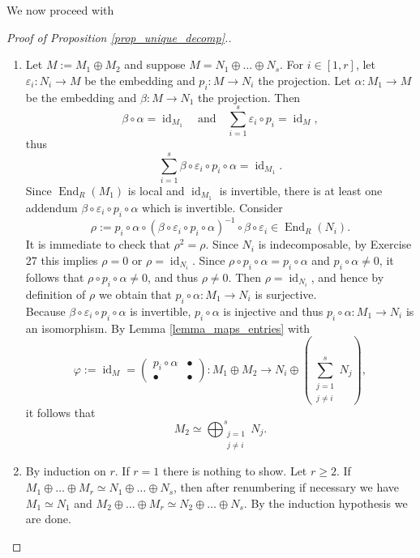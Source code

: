 \documentclass[12pt,a4paper]{report}
\theoremstyle{definition}
\theoremstyle{num.custom-title}
\DeclareMathOperator{\id}{id}
\DeclareMathOperator{\End}{End}
\renewcommand{\epsilon}{\varepsilon}
\renewcommand{\phi}{\varphi}
\begin{document}
We now proceed with
\begin{proof}[Proof of Proposition \ref{prop_unique_decomp}.]\ 
\begin{enumerate}
\item Let $M := M_1 \oplus M_2$ and suppose $M = N_1 \oplus \ldots \oplus N_s$. For $i \in [1,r]$, let $\epsilon_i : N_i \to M$ be the embedding and $p_i : M \to N_i$ the projection. Let $\alpha : M_1 \to M$ be the embedding and $\beta : M \to N_1$ the projection. Then
\[
\beta \circ \alpha = \id_{M_1} \quad \text{and} \quad \sum_{i=1}^s \epsilon_i \circ p_i = \id_M,
\]
thus
\[
\sum_{i=1}^s \beta \circ \epsilon_i \circ p_i \circ \alpha = \id_{M_1}.
\]
Since $\End_R(M_1)$ is local and $\id_{M_1}$ is invertible, there is at least one addendum $\beta \circ \epsilon_i \circ p_i \circ \alpha$ which is invertible. Consider
\[
\rho := p_i \circ \alpha \circ (\beta \circ \epsilon_i \circ p_i \circ \alpha)^{-1} \circ \beta \circ \epsilon_i \in \End_R(N_i).
\]
It is immediate to check that $\rho^2=\rho$. Since $N_i$ is indecomposable, by Exercise 27 this implies $\rho=0$ or $\rho=\id_{N_i}$. Since $\rho \circ p_i \circ \alpha = p_i \circ \alpha$ and $p_i \circ \alpha \neq 0$, it follows that $\rho \circ p_i \circ \alpha \neq 0$, and thus $\rho \neq 0$. Then $\rho=\id_{N_i}$, and hence by definition of $\rho$ we obtain that $p_i \circ \alpha : M_1 \to N_i$ is surjective.\\
Because $\beta \circ \epsilon_i \circ p_i \circ \alpha$ is invertible, $p_i \circ \alpha$ is injective and thus $p_i \circ \alpha : M_1 \to N_i$ is an isomorphism. By Lemma \ref{lemma_maps_entries} with
\[
\phi := \id_M =
\begin{pmatrix}
p_i \circ \alpha & \bullet \\
\bullet & \bullet
\end{pmatrix}
\colon M_1 \oplus M_2 \to N_i \oplus \left( \sum_{\substack{j=1 \\ j \neq i}}^s N_j \right),
\]
it follows that
\[
M_2 \simeq \bigoplus_{\substack{j=1 \\ j \neq i}}^s N_j.
\]
\item By induction on $r$. If $r=1$ there is nothing to show. Let $r \geq 2$. If $M_1 \oplus \ldots \oplus M_r \simeq N_1 \oplus \ldots \oplus N_s$, then after renumbering if necessary we have $M_1 \simeq N_1$ and $M_2 \oplus \ldots \oplus M_r \simeq N_2 \oplus \ldots \oplus N_s$. By the induction hypothesis we are done.
\end{enumerate}
\end{proof}
\end{document}
